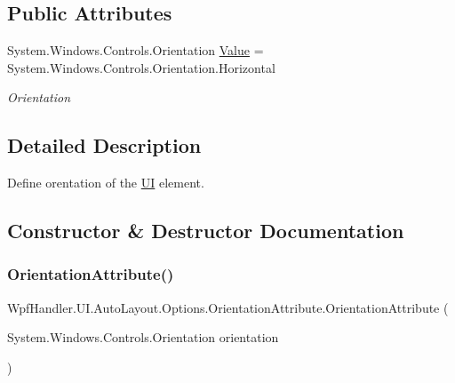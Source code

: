 \subsection*{Public Attributes}
\begin{DoxyCompactItemize}
\item 
System.\+Windows.\+Controls.\+Orientation \mbox{\hyperlink{class_wpf_handler_1_1_u_i_1_1_auto_layout_1_1_options_1_1_orientation_attribute_aa0e346725fdf25d2172e0811e12000ed}{Value}} = System.\+Windows.\+Controls.\+Orientation.\+Horizontal
\begin{DoxyCompactList}\small\item\em Orientation \end{DoxyCompactList}\end{DoxyCompactItemize}


\subsection{Detailed Description}
Define orentation of the \mbox{\hyperlink{namespace_wpf_handler_1_1_u_i}{UI}} element. 



\subsection{Constructor \& Destructor Documentation}
\mbox{\label{class_wpf_handler_1_1_u_i_1_1_auto_layout_1_1_options_1_1_orientation_attribute_a1a2b97e91de843f677c37aac422b3667}} 
\subsubsection{\texorpdfstring{Orientation\+Attribute()}{OrientationAttribute()}}
{\footnotesize\ttfamily Wpf\+Handler.\+U\+I.\+Auto\+Layout.\+Options.\+Orientation\+Attribute.\+Orientation\+Attribute (\begin{DoxyParamCaption}\item[{System.\+Windows.\+Controls.\+Orientation}]{orientation }\end{DoxyParamCaption})}



